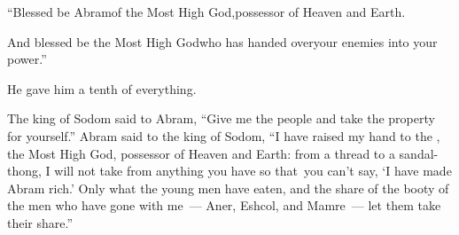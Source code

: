 \begin{inparaenum}
  \pb{}``Blessed be Abram\pa{}of the Most High God,\pa{}possessor of Heaven and Earth.%

  \pb{} And blessed be the Most High God\pa{}who has handed over\pa{}your enemies into your power.''\thinspace{}%

  \noindent He gave him a tenth of everything.

   The king of Sodom said to Abram, ``Give me the people and take the property for yourself.''%
   Abram said to the king of Sodom, ``I have raised my hand to the \lord, the Most High God, possessor of Heaven and Earth:%
   from a thread to a sandal-thong, I will not take from anything you have so that\understood{}\ you can't say, `I have made Abram rich.'%
   Only what the young men have eaten, and the share of the booty of the men who have gone with me~--- Aner, Eshcol, and Mamre~--- let them take their share.''%
\end{inparaenum}
